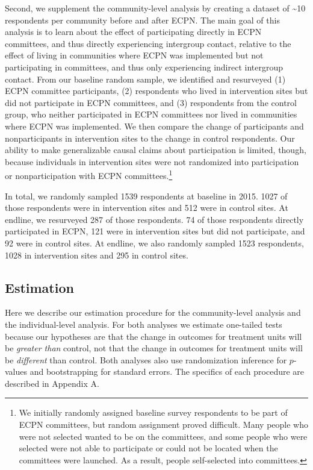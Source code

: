 \documentclass[11pt]{article}
\begin{document}
Second, we supplement the community-level analysis by creating a dataset
of \textasciitilde{}10 respondents per community before and after ECPN.
The main goal of this analysis is to learn about the effect of
participating directly in ECPN committees, and thus directly
experiencing intergroup contact, relative to the effect of living in
communities where ECPN was implemented but not participating in
committees, and thus only experiencing indirect intergroup contact. From
our baseline random sample, we identified and resurveyed (1) ECPN
committee participants, (2) respondents who lived in intervention sites
but did not participate in ECPN committees, and (3) respondents from the
control group, who neither participated in ECPN committees nor lived in
communities where ECPN was implemented. We then compare the change of
participants and nonparticipants in intervention sites to the change in
control respondents. Our ability to make generalizable causal claims
about participation is limited, though, because individuals in
intervention sites were not randomized into participation or
nonparticipation with ECPN committees.\footnote{We initially randomly
  assigned baseline survey respondents to be part of ECPN committees,
  but random assignment proved difficult. Many people who were not
  selected wanted to be on the committees, and some people who were
  selected were not able to participate or could not be located when the
  committees were launched. As a result, people self-selected into
  committees.}

In total, we randomly sampled 1539 respondents at baseline in 2015. 1027
of those respondents were in intervention sites and 512 were in control
sites. At endline, we resurveyed 287 of those respondents. 74 of those
respondents directly participated in ECPN, 121 were in intervention
sites but did not participate, and 92 were in control sites. At endline,
we also randomly sampled 1523 respondents, 1028 in intervention sites
and 295 in control sites.

\hypertarget{estimation}{%
\subsection{Estimation}\label{estimation}}

Here we describe our estimation procedure for the community-level
analysis and the individual-level analysis. For both analyses we
estimate one-tailed tests because our hypotheses are that the change in
outcomes for treatment units will be \emph{greater than} control, not
that the change in outcomes for treatment units will be \emph{different}
than control. Both analyses also use randomization inference for
\(p\)-values and bootstrapping for standard errors. The specifics of
each procedure are described in Appendix A.
\end{document}
